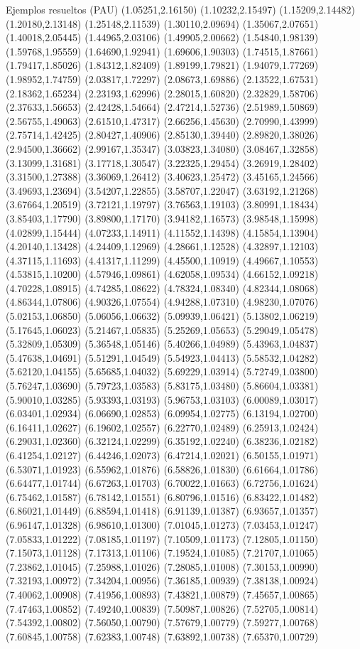 \documentclass[11pt,a4paper]{article}
\begin{document}
\begin{fmex}{Ejemplos resueltos (PAU)}
(1.05251,2.16150) (1.10232,2.15497) (1.15209,2.14482) (1.20180,2.13148) (1.25148,2.11539) (1.30110,2.09694) (1.35067,2.07651) (1.40018,2.05445) (1.44965,2.03106) (1.49905,2.00662) (1.54840,1.98139) (1.59768,1.95559) (1.64690,1.92941) (1.69606,1.90303) (1.74515,1.87661) (1.79417,1.85026) (1.84312,1.82409) (1.89199,1.79821) (1.94079,1.77269) (1.98952,1.74759) (2.03817,1.72297) (2.08673,1.69886) (2.13522,1.67531) (2.18362,1.65234) (2.23193,1.62996) (2.28015,1.60820) (2.32829,1.58706) (2.37633,1.56653) (2.42428,1.54664) (2.47214,1.52736) (2.51989,1.50869) (2.56755,1.49063) (2.61510,1.47317) (2.66256,1.45630) (2.70990,1.43999) (2.75714,1.42425) (2.80427,1.40906) (2.85130,1.39440) (2.89820,1.38026) (2.94500,1.36662) (2.99167,1.35347) (3.03823,1.34080) (3.08467,1.32858) (3.13099,1.31681) (3.17718,1.30547) (3.22325,1.29454) (3.26919,1.28402) (3.31500,1.27388) (3.36069,1.26412) (3.40623,1.25472) (3.45165,1.24566) (3.49693,1.23694) (3.54207,1.22855) (3.58707,1.22047) (3.63192,1.21268) (3.67664,1.20519) (3.72121,1.19797) (3.76563,1.19103) (3.80991,1.18434) (3.85403,1.17790) (3.89800,1.17170) (3.94182,1.16573) (3.98548,1.15998) (4.02899,1.15444) (4.07233,1.14911) (4.11552,1.14398) (4.15854,1.13904) (4.20140,1.13428) (4.24409,1.12969) (4.28661,1.12528) (4.32897,1.12103) (4.37115,1.11693) (4.41317,1.11299) (4.45500,1.10919) (4.49667,1.10553) (4.53815,1.10200) (4.57946,1.09861) (4.62058,1.09534) (4.66152,1.09218) (4.70228,1.08915) (4.74285,1.08622) (4.78324,1.08340) (4.82344,1.08068) (4.86344,1.07806) (4.90326,1.07554) (4.94288,1.07310) (4.98230,1.07076) (5.02153,1.06850) (5.06056,1.06632) (5.09939,1.06421) (5.13802,1.06219) (5.17645,1.06023) (5.21467,1.05835) (5.25269,1.05653) (5.29049,1.05478) (5.32809,1.05309) (5.36548,1.05146) (5.40266,1.04989) (5.43963,1.04837) (5.47638,1.04691) (5.51291,1.04549) (5.54923,1.04413) (5.58532,1.04282) (5.62120,1.04155) (5.65685,1.04032) (5.69229,1.03914) (5.72749,1.03800) (5.76247,1.03690) (5.79723,1.03583) (5.83175,1.03480) (5.86604,1.03381) (5.90010,1.03285) (5.93393,1.03193) (5.96753,1.03103) (6.00089,1.03017) (6.03401,1.02934) (6.06690,1.02853) (6.09954,1.02775) (6.13194,1.02700) (6.16411,1.02627) (6.19602,1.02557) (6.22770,1.02489) (6.25913,1.02424) (6.29031,1.02360) (6.32124,1.02299) (6.35192,1.02240) (6.38236,1.02182) (6.41254,1.02127) (6.44246,1.02073) (6.47214,1.02021) (6.50155,1.01971) (6.53071,1.01923) (6.55962,1.01876) (6.58826,1.01830) (6.61664,1.01786) (6.64477,1.01744) (6.67263,1.01703) (6.70022,1.01663) (6.72756,1.01624) (6.75462,1.01587) (6.78142,1.01551) (6.80796,1.01516) (6.83422,1.01482) (6.86021,1.01449) (6.88594,1.01418) (6.91139,1.01387) (6.93657,1.01357) (6.96147,1.01328) (6.98610,1.01300) (7.01045,1.01273) (7.03453,1.01247) (7.05833,1.01222) (7.08185,1.01197) (7.10509,1.01173) (7.12805,1.01150) (7.15073,1.01128) (7.17313,1.01106) (7.19524,1.01085) (7.21707,1.01065) (7.23862,1.01045) (7.25988,1.01026) (7.28085,1.01008) (7.30153,1.00990) (7.32193,1.00972) (7.34204,1.00956) (7.36185,1.00939) (7.38138,1.00924) (7.40062,1.00908) (7.41956,1.00893) (7.43821,1.00879) (7.45657,1.00865) (7.47463,1.00852) (7.49240,1.00839) (7.50987,1.00826) (7.52705,1.00814) (7.54392,1.00802) (7.56050,1.00790) (7.57679,1.00779) (7.59277,1.00768) (7.60845,1.00758) (7.62383,1.00748) (7.63892,1.00738) (7.65370,1.00729) 
\end{fmex}
\end{document}
